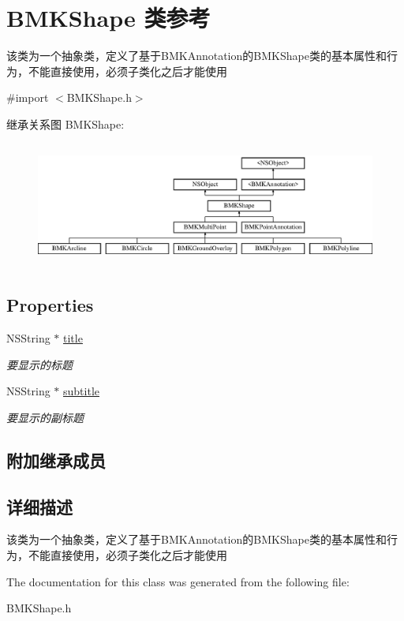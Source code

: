 \hypertarget{interface_b_m_k_shape}{\section{B\-M\-K\-Shape 类参考}
\label{interface_b_m_k_shape}
}


该类为一个抽象类，定义了基于\-B\-M\-K\-Annotation的\-B\-M\-K\-Shape类的基本属性和行为，不能直接使用，必须子类化之后才能使用  




{\ttfamily \#import $<$B\-M\-K\-Shape.\-h$>$}

继承关系图 B\-M\-K\-Shape\-:\begin{figure}[H]
\begin{center}
\leavevmode
\includegraphics[height=4.148148cm]{interface_b_m_k_shape}
\end{center}
\end{figure}
\subsection*{Properties}
\begin{DoxyCompactItemize}
\item 
\hypertarget{interface_b_m_k_shape_a64da6d2885114c0c2da35aa1ffec925d}{N\-S\-String $\ast$ \hyperlink{interface_b_m_k_shape_a64da6d2885114c0c2da35aa1ffec925d}{title}}\label{interface_b_m_k_shape_a64da6d2885114c0c2da35aa1ffec925d}

\begin{DoxyCompactList}\small\item\em 要显示的标题 \end{DoxyCompactList}\item 
\hypertarget{interface_b_m_k_shape_ae588ba39a27b52bcaed14d40e6494398}{N\-S\-String $\ast$ \hyperlink{interface_b_m_k_shape_ae588ba39a27b52bcaed14d40e6494398}{subtitle}}\label{interface_b_m_k_shape_ae588ba39a27b52bcaed14d40e6494398}

\begin{DoxyCompactList}\small\item\em 要显示的副标题 \end{DoxyCompactList}\end{DoxyCompactItemize}
\subsection*{附加继承成员}


\subsection{详细描述}
该类为一个抽象类，定义了基于\-B\-M\-K\-Annotation的\-B\-M\-K\-Shape类的基本属性和行为，不能直接使用，必须子类化之后才能使用 

The documentation for this class was generated from the following file\-:\begin{DoxyCompactItemize}
\item 
B\-M\-K\-Shape.\-h\end{DoxyCompactItemize}
